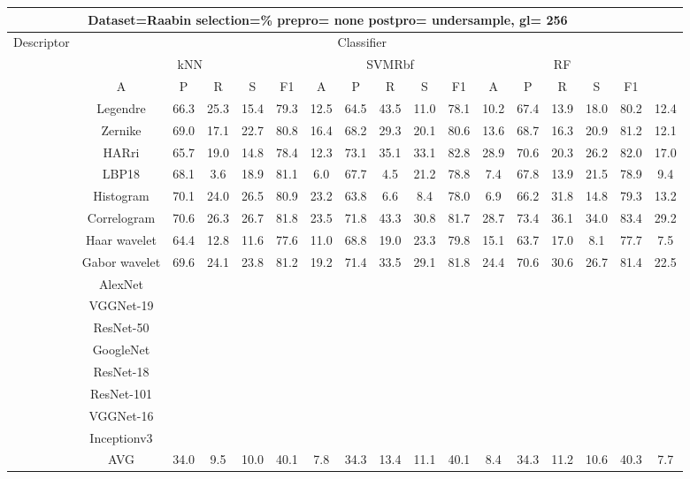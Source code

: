 \documentclass[12pt,italian]{article}
\begin{document}
\begin{tiny}
\begin{longtable}{lcccccccccccccccc}
\toprule
\multicolumn{16}{c}{Dataset=Raabin selection=\% prepro= none postpro= undersample, gl= 256} \\ 
\toprule
Descriptor & \multicolumn{15}{c}{Classifier} \\ 
& \multicolumn{5}{c}{kNN} & \multicolumn{5}{c}{SVMRbf} & \multicolumn{5}{c}{RF} \\ 
& A & P & R & S & F1 & A & P & R & S & F1 & A & P & R & S & F1 \\ 
\midrule
& Legendre & 66.3 & 25.3 & 15.4 & 79.3 & 12.5 & 64.5 & 43.5 & 11.0 & 78.1 & 10.2 & 67.4 & 13.9 & 18.0 & 80.2 & 12.4 \\ 
& Zernike & 69.0 & 17.1 & 22.7 & 80.8 & 16.4 & 68.2 & 29.3 & 20.1 & 80.6 & 13.6 & 68.7 & 16.3 & 20.9 & 81.2 & 12.1 \\ 
& HARri & 65.7 & 19.0 & 14.8 & 78.4 & 12.3 & 73.1 & 35.1 & 33.1 & 82.8 & 28.9 & 70.6 & 20.3 & 26.2 & 82.0 & 17.0 \\ 
& LBP18 & 68.1 &  3.6 & 18.9 & 81.1 &  6.0 & 67.7 &  4.5 & 21.2 & 78.8 &  7.4 & 67.8 & 13.9 & 21.5 & 78.9 &  9.4 \\ 
& Histogram & 70.1 & 24.0 & 26.5 & 80.9 & 23.2 & 63.8 &  6.6 &  8.4 & 78.0 &  6.9 & 66.2 & 31.8 & 14.8 & 79.3 & 13.2 \\ 
& Correlogram & 70.6 & 26.3 & 26.7 & 81.8 & 23.5 & 71.8 & 43.3 & 30.8 & 81.7 & 28.7 & 73.4 & 36.1 & 34.0 & 83.4 & 29.2 \\ 
& Haar wavelet & 64.4 & 12.8 & 11.6 & 77.6 & 11.0 & 68.8 & 19.0 & 23.3 & 79.8 & 15.1 & 63.7 & 17.0 &  8.1 & 77.7 &  7.5 \\ 
& Gabor wavelet & 69.6 & 24.1 & 23.8 & 81.2 & 19.2 & 71.4 & 33.5 & 29.1 & 81.8 & 24.4 & 70.6 & 30.6 & 26.7 & 81.4 & 22.5 \\ 
& AlexNet \\ 
& VGGNet-19 \\ 
& ResNet-50 \\ 
& GoogleNet \\ 
& ResNet-18 \\ 
& ResNet-101 \\ 
& VGGNet-16 \\ 
& Inceptionv3 \\ 
\hline
& AVG & 34.0 &  9.5 & 10.0 & 40.1 &  7.8 & 34.3 & 13.4 & 11.1 & 40.1 &  8.4 & 34.3 & 11.2 & 10.6 & 40.3 &  7.7 \\ 
\hline
\bottomrule
\end{longtable} 


\end{tiny}
\end{document}
